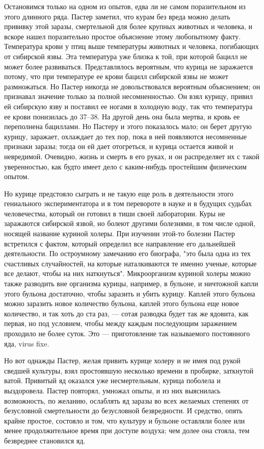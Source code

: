 Остановимся только на одном из  опытов, едва ли не самом поразительном
из  этого длинного  ряда. Пастер  заметил, что  курам без  вреда можно
делать прививку  этой заразы,  смертельной для более  крупных животных
и  человека,  и вскоре  нашел  поразительно  простое объяснение  этому
любопытному факту. Температура крови  у птиц выше температуры животных
и человека, погибающих от сибирской язвы. Эта температура уже близка к
той,  при которой  бацилл не  может более  развиваться. Представлялось
вероятным, что  курица не  заражается потому,  что при  температуре ее
крови бацилл сибирской  язвы не может размножаться.  Но Пастер никогда
не довольствовался вероятным объяснением; он признавал значение только
за полной несомненностью.  Он взял курицу, привил ей  сибирскую язву и
поставил  ее ногами  в холодную  воду,  так что  температура ее  крови
понизилась  до 37--38.  На другой  день она  была мертва,  и кровь  ее
переполнена бациллами.  Но Пастеру и  этого показалось мало;  он берет
другую курицу, заражает,  охлаждает до тех пор, пока  в ней появляются
несомненные признаки  заразы; тогда  он ей  дает отогреться,  и курица
остается живой и  невредимой. Очевидно, жизнь и смерть в  его руках, и
он  распределяет их  с  такой  уверенностью, как  будто  имеет дело  с
каким-нибудь простейшим физическим опытом.

Но курице предстояло сыграть и не  такую еще роль в деятельности этого
гениального экспериментатора  и в том  перевороте в науке и  в будущих
судьбах  человечестма, который  он готовил  в тиши  своей лаборатории.
Куры не  заражаются сибирской  язвой, но  болеют другими  болезнями, в
том  числе  одной,  носящей  название  куриной  холеры.  При  изучении
этой-то  болезни Пастер  встретился  с фактом,  который определил  все
направление его дальнейшей деятельности.  По остроумному замечанию его
биографа, "это  была одна из  тех счастливых случайностей,  на которые
наталкиваются  те именно  ученые,  которые все  делают,  чтобы на  них
наткнуться". Микроорганизм  куриной холеры  можно также  разводить вне
организма курицы, например, в бульоне, и ничтожной капли этого бульона
достаточно, чтобы заразить и убить  курицу. Каплей этого бульона можно
заразить  новое количество  бульона,  каплей этого  бульона еще  новое
количество, и  так хоть до  ста раз, ---  сотая разводка будет  так же
ядовита, как первая,  но под условием, чтобы  между каждым последующим
заражением  проходило  не  более  суток.  Это  ---  приготовление  так
называемого постоянного яда, virus fixe.

Но  вот  однажды  Пастер,  желая  привить  курице  холеру  и  не  имея
под  рукой  сведшей культуры,  взял  простоявшую  несколько времени  в
пробирке,  заткнутой ватой.  Привитый яд  оказался уже  несмертельным,
курица поболела  и выздоровела. Пастер  повторял, умножал опыты,  и из
них  выяснилась  возможность,  по  желанию,  ослаблять  яд  заразы  во
всех  желаемых степенях  от безусловной  смертельности до  безусловной
безвредности. И  средство, опять крайне  простое, состояло и  том, что
культуру и бульоне оставляли более или менее продолжительное время при
доступе воздуха; чем долее она стояла, тем безвреднее становился яд.


